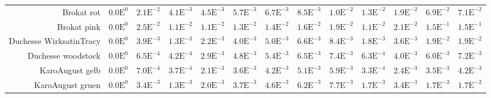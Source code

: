 \begin{landscape}
\begin{table}
\begin{tabularx}{\linewidth}{r | rr | rrrrrr | rrrr}
        Brokat rot & \footnotesize{$0.0\mathrm{E}^{0}$}& \footnotesize{$2.1\mathrm{E}^{-2}$}& \footnotesize{$4.1\mathrm{E}^{-3}$}& \footnotesize{$4.5\mathrm{E}^{-3}$}& \footnotesize{$5.7\mathrm{E}^{-3}$}& \footnotesize{$6.7\mathrm{E}^{-3}$}& \footnotesize{$8.5\mathrm{E}^{-3}$}& \footnotesize{$1.0\mathrm{E}^{-2}$}& \footnotesize{$1.3\mathrm{E}^{-2}$}& \footnotesize{$1.9\mathrm{E}^{-2}$}& \footnotesize{$6.9\mathrm{E}^{-2}$}& \footnotesize{$7.1\mathrm{E}^{-2}$}\\
        Brokat pink & \footnotesize{$0.0\mathrm{E}^{0}$}& \footnotesize{$2.5\mathrm{E}^{-2}$}& \footnotesize{$1.1\mathrm{E}^{-2}$}& \footnotesize{$1.1\mathrm{E}^{-2}$}& \footnotesize{$1.3\mathrm{E}^{-2}$}& \footnotesize{$1.4\mathrm{E}^{-2}$}& \footnotesize{$1.6\mathrm{E}^{-2}$}& \footnotesize{$1.9\mathrm{E}^{-2}$}& \footnotesize{$1.1\mathrm{E}^{-2}$}& \footnotesize{$2.1\mathrm{E}^{-2}$}& \footnotesize{$1.5\mathrm{E}^{-1}$}& \footnotesize{$1.5\mathrm{E}^{-1}$}\\
        Duchesse WirksatinTracy & \footnotesize{$0.0\mathrm{E}^{0}$}& \footnotesize{$3.9\mathrm{E}^{-3}$}& \footnotesize{$1.3\mathrm{E}^{-3}$}& \footnotesize{$2.2\mathrm{E}^{-3}$}& \footnotesize{$4.0\mathrm{E}^{-3}$}& \footnotesize{$5.0\mathrm{E}^{-3}$}& \footnotesize{$6.6\mathrm{E}^{-3}$}& \footnotesize{$8.4\mathrm{E}^{-3}$}& \footnotesize{$1.8\mathrm{E}^{-3}$}& \footnotesize{$3.6\mathrm{E}^{-3}$}& \footnotesize{$1.9\mathrm{E}^{-2}$}& \footnotesize{$1.9\mathrm{E}^{-2}$}\\
        Duchesse woodstock  & \footnotesize{$0.0\mathrm{E}^{0}$}& \footnotesize{$6.5\mathrm{E}^{-4}$}& \footnotesize{$4.2\mathrm{E}^{-4}$}& \footnotesize{$2.9\mathrm{E}^{-3}$}& \footnotesize{$4.8\mathrm{E}^{-3}$}& \footnotesize{$5.4\mathrm{E}^{-3}$}& \footnotesize{$6.5\mathrm{E}^{-3}$}& \footnotesize{$7.4\mathrm{E}^{-3}$}& \footnotesize{$6.3\mathrm{E}^{-4}$}& \footnotesize{$4.0\mathrm{E}^{-3}$}& \footnotesize{$6.0\mathrm{E}^{-3}$}& \footnotesize{$7.2\mathrm{E}^{-3}$}\\
        KaroAugust gelb  & \footnotesize{$0.0\mathrm{E}^{0}$}& \footnotesize{$7.0\mathrm{E}^{-4}$}& \footnotesize{$3.7\mathrm{E}^{-4}$}& \footnotesize{$2.1\mathrm{E}^{-3}$}& \footnotesize{$3.6\mathrm{E}^{-3}$}& \footnotesize{$4.2\mathrm{E}^{-3}$}& \footnotesize{$5.1\mathrm{E}^{-3}$}& \footnotesize{$5.9\mathrm{E}^{-3}$}& \footnotesize{$3.3\mathrm{E}^{-4}$}& \footnotesize{$2.4\mathrm{E}^{-3}$}& \footnotesize{$3.5\mathrm{E}^{-3}$}& \footnotesize{$4.2\mathrm{E}^{-3}$}\\
        KaroAugust gruen  & \footnotesize{$0.0\mathrm{E}^{0}$}& \footnotesize{$3.4\mathrm{E}^{-3}$}& \footnotesize{$1.3\mathrm{E}^{-3}$}& \footnotesize{$2.0\mathrm{E}^{-3}$}& \footnotesize{$3.7\mathrm{E}^{-3}$}& \footnotesize{$4.6\mathrm{E}^{-3}$}& \footnotesize{$6.2\mathrm{E}^{-3}$}& \footnotesize{$7.7\mathrm{E}^{-3}$}& \footnotesize{$1.7\mathrm{E}^{-3}$}& \footnotesize{$3.4\mathrm{E}^{-3}$}& \footnotesize{$1.7\mathrm{E}^{-2}$}& \footnotesize{$1.7\mathrm{E}^{-2}$}\\

\end{tabularx}
\end{table}
\end{landscape}
